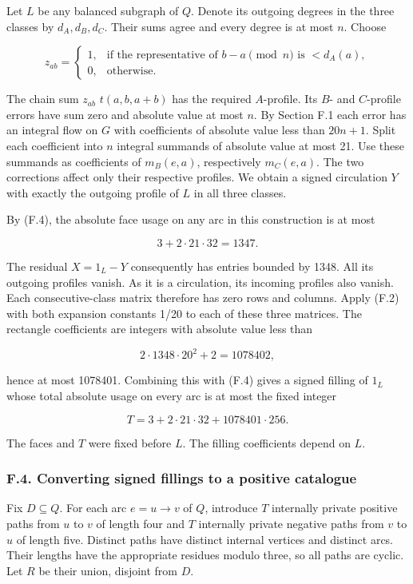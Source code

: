 \documentclass[english,11pt,a4paper]{article}
\begin{document}
Let \(L\) be any balanced subgraph of \(Q\). Denote its outgoing degrees in the three classes by \(d_{A},d_{B},d_{C}\). Their sums agree and every degree is at most \(n\). Choose

\[z_{ab}=\begin{cases}1,&\text{if the representative of }b-a\pmod n\text{ is }<d_A(a),\\0,&\text{otherwise.}\end{cases}\]

The chain sum \(z_{ab}\) \(t(a,b,a+b)\) has the required \(A\)-profile. Its \(B\)- and \(C\)-profile errors have sum zero and absolute value at most \(n\). By Section F.1 each error has an integral flow on \(G\) with coefficients of absolute value less than \(20n+1\). Split each coefficient into \(n\) integral summands of absolute value at most 21. Use these summands as coefficients of \(m_{B}(e,a)\), respectively \(m_{C}(e,a)\). The two corrections affect only their respective profiles. We obtain a signed circulation \(Y\) with exactly the outgoing profile of \(L\) in all three classes.

By (F.4), the absolute face usage on any arc in this construction is at most

\[3+2\cdot21\cdot32=1347.\]

The residual \(X=1_{L}-Y\) consequently has entries bounded by 1348. All its outgoing profiles vanish. As it is a circulation, its incoming profiles also vanish. Each consecutive-class matrix therefore has zero rows and columns. Apply (F.2) with both expansion constants 1/20 to each of these three matrices. The rectangle coefficients are integers with absolute value less than

\[2\cdot1348\cdot20^2+2=1078402,\]

hence at most 1078401. Combining this with (F.4) gives a signed filling of \(1_{L}\) whose total absolute usage on every arc is at most the fixed integer

\[T=3+2\cdot21\cdot32+1078401\cdot256.\tag{F.5}\]

The faces and \(T\) were fixed before \(L\). The filling coefficients depend on \(L\).

\subsubsection{F.4. Converting signed fillings to a positive catalogue}\label{f.4.-converting-signed-fillings-to-a-positive-catalogue}

Fix \(D\subseteq Q\). For each arc \(e=u\to v\) of \(Q\), introduce \(T\) internally private positive paths from \(u\) to \(v\) of length four and \(T\) internally private negative paths from \(v\) to \(u\) of length five. Distinct paths have distinct internal vertices and distinct arcs. Their lengths have the appropriate residues modulo three, so all paths are cyclic. Let \(R\) be their union, disjoint from \(D\).
\end{document}
